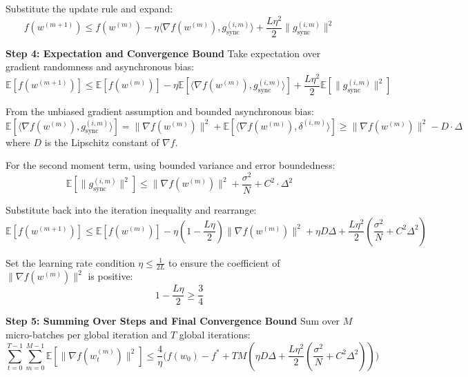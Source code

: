 Substitute the update rule and expand:
\begin{equation}
f(w^{(m+1)}) \leq f(w^{(m)}) - \eta \langle \nabla f(w^{(m)}), g_{\text{sync}}^{(i,m)} \rangle + \frac{L\eta^2}{2}\|g_{\text{sync}}^{(i,m)}\|^2
\end{equation}

\textbf{Step 4: Expectation and Convergence Bound}
Take expectation over gradient randomness and asynchronous bias:
\begin{equation}
\mathbb{E}[f(w^{(m+1)})] \leq \mathbb{E}[f(w^{(m)})] - \eta \mathbb{E}\left[\langle \nabla f(w^{(m)}), g_{\text{sync}}^{(i,m)} \rangle\right] + \frac{L\eta^2}{2}\mathbb{E}\left[\|g_{\text{sync}}^{(i,m)}\|^2\right]
\end{equation}

From the unbiased gradient assumption and bounded asynchronous bias:
\begin{equation}
\mathbb{E}\left[\langle \nabla f(w^{(m)}), g_{\text{sync}}^{(i,m)} \rangle\right] = \|\nabla f(w^{(m)})\|^2 + \mathbb{E}\left[\langle \nabla f(w^{(m)}), \delta^{(i,m)} \rangle\right] \geq \|\nabla f(w^{(m)})\|^2 - D \cdot \Delta
\end{equation}
where $D$ is the Lipschitz constant of $\nabla f$.

For the second moment term, using bounded variance and error boundedness:
\begin{equation}
\mathbb{E}\left[\|g_{\text{sync}}^{(i,m)}\|^2\right] \leq \|\nabla f(w^{(m)})\|^2 + \frac{\sigma^2}{N} + C^2 \cdot \Delta^2
\end{equation}

Substitute back into the iteration inequality and rearrange:
\begin{equation}
\mathbb{E}[f(w^{(m+1)})] \leq \mathbb{E}[f(w^{(m)})] - \eta\left(1 - \frac{L\eta}{2}\right)\|\nabla f(w^{(m)})\|^2 + \eta D \Delta + \frac{L\eta^2}{2}\left(\frac{\sigma^2}{N} + C^2 \Delta^2\right)
\end{equation}

Set the learning rate condition $\eta \leq \frac{1}{2L}$ to ensure the coefficient of $\|\nabla f(w^{(m)})\|^2$ is positive:
\begin{equation}
1 - \frac{L\eta}{2} \geq \frac{3}{4}
\end{equation}

\textbf{Step 5: Summing Over Steps and Final Convergence Bound}
Sum over $M$ micro-batches per global iteration and $T$ global iterations:
\begin{equation}
\sum_{t=0}^{T-1}\sum_{m=0}^{M-1} \mathbb{E}\left[\|\nabla f(w_t^{(m)})\|^2\right] \leq \frac{4}{\eta}\Bigg(f(w_0) - f^* + T M \left(\eta D \Delta + \frac{L\eta^2}{2}\left(\frac{\sigma^2}{N} + C^2 \Delta^2\right)\right)\Bigg)
\end{equation}

